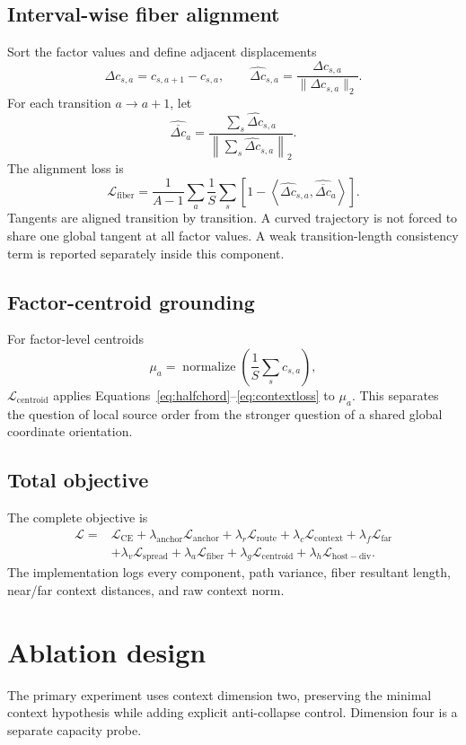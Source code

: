 \documentclass[11pt]{article}
\newcommand{\Lc}{\mathcal{L}_{\mathrm{context}}}
\newcommand{\Lfar}{\mathcal{L}_{\mathrm{far}}}
\newcommand{\Lspread}{\mathcal{L}_{\mathrm{spread}}}
\newcommand{\Lfiber}{\mathcal{L}_{\mathrm{fiber}}}
\newcommand{\Lcentroid}{\mathcal{L}_{\mathrm{centroid}}}
\newcommand{\Lroute}{\mathcal{L}_{\mathrm{route}}}
\begin{document}
\subsection{Interval-wise fiber alignment}
Sort the factor values and define adjacent displacements
\[
 \Delta c_{s,a}=c_{s,a+1}-c_{s,a},
 \qquad
 \widehat{\Delta c}_{s,a}=\frac{\Delta c_{s,a}}{\lVert\Delta c_{s,a}\rVert_2}.
\]
For each transition $a\rightarrow a+1$, let
\[
 \widehat{\overline{\Delta c}}_a=
 \frac{\sum_s\widehat{\Delta c}_{s,a}}
 {\left\lVert\sum_s\widehat{\Delta c}_{s,a}\right\rVert_2}.
\]
The alignment loss is
\begin{equation}
 \Lfiber=
 \frac{1}{A-1}\sum_a
 \frac{1}{S}\sum_s
 \left[
 1-\left\langle
 \widehat{\Delta c}_{s,a},
 \widehat{\overline{\Delta c}}_a
 \right\rangle
 \right].
 \label{eq:fiberloss}
\end{equation}
Tangents are aligned transition by transition. A curved trajectory is not forced to share one global tangent at all factor values. A weak transition-length consistency term is reported separately inside this component.

\subsection{Factor-centroid grounding}
For factor-level centroids
\[
 \mu_a=\operatorname{normalize}\!\left(\frac{1}{S}\sum_s c_{s,a}\right),
\]
$\Lcentroid$ applies Equations~\eqref{eq:halfchord}--\eqref{eq:contextloss} to $\mu_a$. This separates the question of local source order from the stronger question of a shared global coordinate orientation.

\subsection{Total objective}
The complete objective is
\begin{align}
 \mathcal{L}={}&
 \mathcal{L}_{\mathrm{CE}}
 +\lambda_{\mathrm{anchor}}\mathcal{L}_{\mathrm{anchor}}
 +\lambda_r\Lroute
 +\lambda_c\Lc
 +\lambda_f\Lfar \\
 &+\lambda_v\Lspread
 +\lambda_a\Lfiber
 +\lambda_g\Lcentroid
 +\lambda_h\mathcal{L}_{\mathrm{host-div}}.
 \label{eq:total}
\end{align}
The implementation logs every component, path variance, fiber resultant length, near/far context distances, and raw context norm.

\section{Ablation design}
The primary experiment uses context dimension two, preserving the minimal context hypothesis while adding explicit anti-collapse control. Dimension four is a separate capacity probe.
\end{document}
